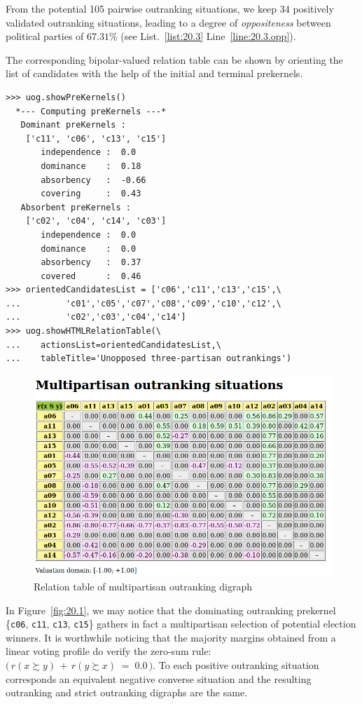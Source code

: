 From the potential 105 pairwise outranking situations, we keep 34 positively validated outranking situations, leading to a degree of \emph{oppositeness} between political parties of $67.31\%$ (see List.~\ref{list:20.3} Line~\ref{line:20.3.opp}).

The corresponding bipolar-valued relation table can be shown by orienting the list of candidates with the help of the initial and terminal prekernels.
\begin{lstlisting}[caption={Computing unopposed multiobjective outranking situations},label=list:20.4]
>>> uog.showPreKernels()
  *--- Computing preKernels ---*
   Dominant preKernels :
    ['c11', 'c06', 'c13', 'c15']
       independence :  0.0
       dominance    :  0.18
       absorbency   :  -0.66
       covering     :  0.43
   Absorbent preKernels :
    ['c02', 'c04', 'c14', 'c03']
       independence :  0.0
       dominance    :  0.0
       absorbency   :  0.37
       covered      :  0.46
>>> orientedCandidatesList = ['c06','c11','c13','c15',\
...         'c01','c05','c07','c08','c09','c10','c12',\
...         'c02','c03','c04','c14']
>>> uog.showHTMLRelationTable(\
...    actionsList=orientedCandidatesList,\
...    tableTitle='Unopposed three-partisan outrankings')
\end{lstlisting}

\begin{figure}[ht]
\includegraphics[width=0.9\hsize]{Figures/20-1-unOpposedOutrankings.png}
\caption{Relation table of multipartisan outranking digraph} 
\label{fig:20.1}       %
\end{figure}

In Figure~\vref{fig:20.1}, we may notice that the dominating outranking prekernel \{\texttt{c06}, \texttt{c11}, \texttt{c13}, \texttt{c15}\} gathers in fact a multipartisan selection of potential election winners. It is worthwhile noticing that the majority margins obtained from a linear voting profile do verify the zero-sum rule: $\big(\,r(x \succsim y) \,+\, r(y \succsim x) \;=\; 0.0\,\big)$. To each positive outranking situation corresponds an equivalent negative converse situation and the resulting outranking and strict outranking digraphs are the same.

